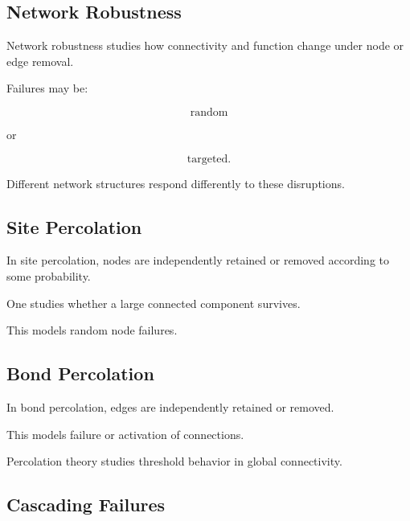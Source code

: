 \subsection{Network Robustness}
\label{subsec:network-robustness}

Network robustness studies how connectivity and function change under node
or edge removal.

Failures may be:

\[
\boxed{
\text{random}
}
\]

or

\[
\boxed{
\text{targeted}.
}
\]

Different network structures respond differently to these disruptions.

\subsection{Site Percolation}
\label{subsec:site-percolation-network}

In site percolation, nodes are independently retained or removed according to
some probability.

One studies whether a large connected component survives.

This models random node failures.

\subsection{Bond Percolation}
\label{subsec:bond-percolation-network}

In bond percolation, edges are independently retained or removed.

This models failure or activation of connections.

Percolation theory studies threshold behavior in global connectivity.

\subsection{Cascading Failures}
\label{subsec:cascading-failures}

